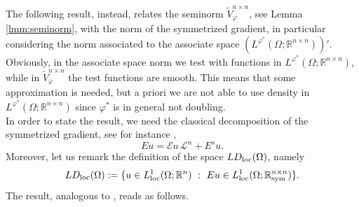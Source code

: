 \documentclass[a4paper,11pt,oneside,notitlepage]{article}
\numberwithin{equation}{section}
\def\R{\mathbb{R}}
\def\loc{{\rm loc}}
\def\sym{{\rm sym}}
\newcommand{\vphi}{\varphi}
\newcommand{\E}{\mathcal{E}}
\newcommand{\st}{ \ : \ }
\begin{document}
The following result, instead, relates the seminorm $\widetilde{V}^{n\times n}_\vphi$, see Lemma \ref{lmm:seminorm}, with the norm of the symmetrized gradient, in particular considering the norm associated to the associate space $(L^{\vphi^*}(\Omega; \R^{n \times n}))'$. Obviously, in the associate space norm we test with functions in $L^{\vphi^*}(\Omega; \R^{n \times n})$, while in $\widetilde{V}^{n\times n}_\vphi$ the test functions are smooth. This means that some approximation is needed, but a priori we are not able to use density in $L^{\vphi^*}(\Omega; \R^{n \times n})$ since $\vphi^*$ is in general not doubling.
\\
In order to state the result, we need the classical decomposition of the symmetrized gradient, see for instance \cite{BCD},
\begin{equation*}
    Eu = \E u \, \mathcal{L}^n + E^s u.
\end{equation*}
Moreover, let us remark the definition of the space $LD_\loc(\Omega)$, namely
\begin{equation*}
    LD_\loc(\Omega) := \{u \in L^1_\loc(\Omega; \R^n) \st Eu \in L^1_\loc(\Omega;\R^{n \times n}_\sym)\}.
\end{equation*}
The result, analogous to \cite[Theorem 5.2]{EHH}, reads as follows.
\end{document}
